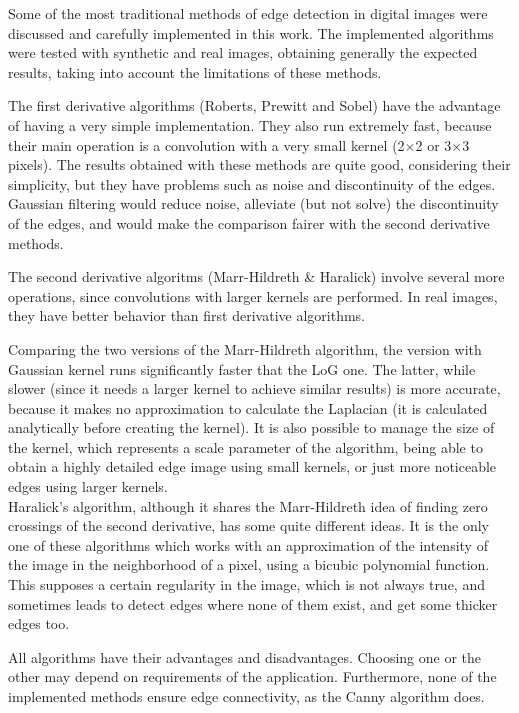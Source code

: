\documentclass{ipol}
\numberwithin{equation}{section}
\numberwithin{table}{section}
\begin{document}
Some of the most traditional methods of edge detection in digital images were discussed and carefully implemented in this work. The implemented algorithms were tested with synthetic and real images, obtaining generally the expected results, taking into account the limitations of these methods. 

The first derivative algorithms (Roberts, Prewitt and Sobel) have the advantage of having a very simple implementation. They also run extremely fast, because their main operation is a convolution with a very small kernel (2$\times$2 or 3$\times$3 pixels). The results obtained with these methods are quite good, considering their simplicity, but they have problems such as noise and discontinuity of the edges. Gaussian filtering would reduce noise, alleviate (but not solve) the discontinuity of the edges, and would make the comparison fairer with the second derivative methods. 

The second derivative algoritms (Marr-Hildreth \& Haralick) involve several more operations, since convolutions with larger kernels are performed. In real images, they have better behavior than first derivative algorithms. 

Comparing the two versions of the Marr-Hildreth algorithm, the version with Gaussian kernel runs significantly faster that the LoG one. The latter, while slower (since it needs a larger kernel to achieve similar results) is more accurate, because it makes no approximation to calculate the Laplacian (it is calculated analytically before creating the kernel). It is also possible to manage the size of the kernel, which represents a scale parameter of the algorithm, being able to obtain a highly detailed edge image using small kernels, or just more noticeable edges using larger kernels. \\

Haralick's algorithm, although it shares the Marr-Hildreth idea of finding zero crossings of the second derivative, has some quite different ideas. It is the only one of these algorithms which works with an approximation of the intensity of the image in the neighborhood of a pixel, using a bicubic polynomial function. This supposes a certain regularity in the image, which is not always true, and sometimes leads to detect edges where none of them exist, and get some thicker edges too. 

All algorithms have their advantages and disadvantages. Choosing one or the other may depend on requirements of the application. Furthermore, none of the implemented methods ensure edge connectivity, as the Canny \cite{Canny1986} algorithm does.
\end{document}
